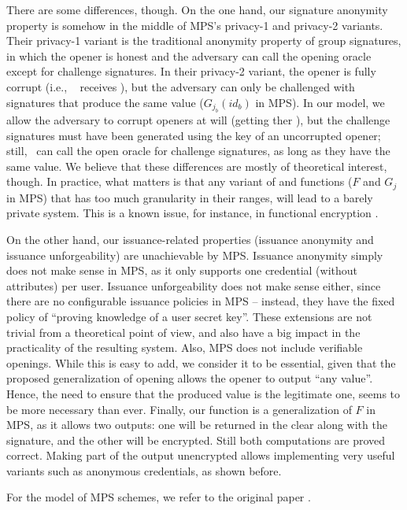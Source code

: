 There are some differences, though. On the one hand, our signature anonymity
property is somehow in the middle of MPS's privacy-1 and privacy-2 variants.
Their privacy-1 variant is the traditional anonymity property of group
signatures, in which the opener is honest and the adversary can call the opening
oracle except for challenge signatures. In their privacy-2 variant, the opener
is fully corrupt (i.e., \adv~ receives \osk), but the adversary can only be
challenged with signatures that produce the same \yinsp value ($G_{j_b}(id_b)$
in MPS). In our \UAS model, we allow the adversary to corrupt openers at will
(getting ther \osk), but the challenge signatures must have been generated using
the key of an uncorrupted opener; still, \adv~can call the open oracle for
challenge signatures, as long as they have the same \yinsp value. We believe
that these differences are mostly of theoretical interest, though. In practice,
what matters is that any variant of \feval and \finsp functions ($F$ and $G_j$
in MPS) that has too much granularity in their ranges, will lead to a barely
private system. This is a known issue, for instance, in functional encryption
\needcite.

On the other hand, our issuance-related properties (issuance anonymity and
issuance unforgeability) are unachievable by MPS. Issuance anonymity simply does
not make sense in MPS, as it only supports one credential (without attributes)
per user. Issuance unforgeability does not make sense either, since there are no
configurable issuance policies in MPS -- instead, they have the fixed policy of
``proving knowledge of a user secret key''. These extensions are not trivial
from a theoretical point of view, and also have a big impact in the practicality
of the resulting system. Also, MPS does not include verifiable openings. While
this is easy to add, we consider it to be essential, given that the proposed
generalization of opening allows the opener to output ``any value''. Hence, the
need to ensure that the produced value is the legitimate one, seems to be more
necessary than ever. Finally, our \feval function is a generalization of $F$ in
MPS, as it allows two outputs: one will be returned in the clear along with the
signature, and the other will be encrypted. Still both computations are proved
correct. Making part of the output unencrypted allows implementing very useful
variants such as anonymous credentials, as shown before.

For the model of MPS schemes, we refer to the original paper \needcite.

